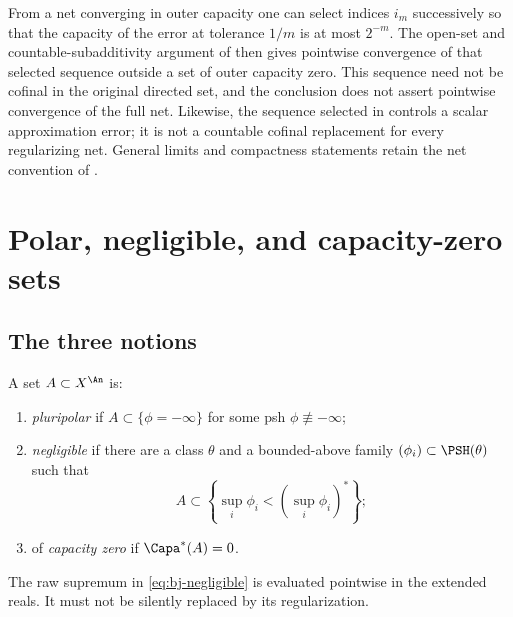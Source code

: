 \begin{remark}
\label{rem:ch48-nets}
\label{sec:ch48-nets}
From a net converging in outer capacity one can select indices $i_m$
successively so that the capacity of the error at tolerance $1/m$ is at
most $2^{-m}$. The open-set and countable-subadditivity argument of
 then gives pointwise convergence
of that selected sequence outside a set of outer capacity zero.
This sequence need not be cofinal in the original directed set, and
the conclusion does not assert pointwise convergence of the full net.
Likewise, the sequence selected in  controls
a scalar approximation error; it is not a countable cofinal replacement
for every regularizing net. General limits and compactness statements
retain the net convention of .
\end{remark}


\section{Polar, negligible, and capacity-zero sets}
\label{sec:ch48-small-sets}

\subsection{The three notions}
\label{sec:ch48-three-notions}

\begin{definition}
\label{def:bj-three-small-sets}
A set $A\subset X^{\An}$ is:

\begin{enumerate}
\item \emph{pluripolar} if
      $A\subset\{\phi=-\infty\}$ for some psh $\phi\not\equiv-\infty$;
\item \emph{negligible} if there are a class $\theta$ and a bounded-above
      family $(\phi_i)\subset\PSH(\theta)$ such that
\[
 A\subset\left\{\sup_i\phi_i<(\sup_i\phi_i)^*\right\};
\tag{48.11}\label{eq:bj-negligible}
\]
\item of \emph{capacity zero} if $\Capa^*(A)=0$.
\end{enumerate}
\end{definition}

The raw supremum in \eqref{eq:bj-negligible} is evaluated pointwise in the
extended reals.  It must not be silently replaced by its regularization.

